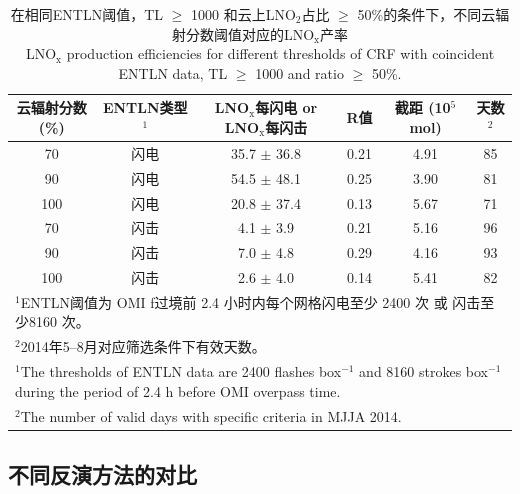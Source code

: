 \begin{table}[h]
\scriptsize
\caption{在相同ENTLN阈值，TL $\geq$ 1000 和云上LNO$_2$占比 $\geq$ 50\%的条件下，不同云辐射分数阈值对应的LNO$_\textrm{x}$产率 \\ LNO$_\textrm{x}$ production efficiencies for different thresholds of CRF with coincident ENTLN data, TL $\geq$ 1000 and ratio $\geq$ 50\%.}
\begin{tabular}{cccccc}
\hline
\textbf{云辐射分数 (\%)} & \textbf{ENTLN类型$^1$} & \textbf{LNO$_\textrm{x}$每闪电 or LNO$_\textrm{x}$每闪击} & \textbf{R值} & \textbf{截距 (10$^{5}$mol)} & \textbf{天数$^2$} \\
\hline
70  & 闪电  & 35.7  $\pm$ 36.8 & 0.21 & 4.91 & 85 \\
90  & 闪电  & 54.5  $\pm$ 48.1 & 0.25 & 3.90 & 81 \\
100 & 闪电  & 20.8  $\pm$ 37.4 & 0.13 & 5.67 & 71 \\
70  & 闪击 & 4.1   $\pm$ 3.9  & 0.21 & 5.16 & 96 \\
90  & 闪击 & 7.0   $\pm$ 4.8  & 0.29 & 4.16 & 93 \\
100 & 闪击 & 2.6   $\pm$ 4.0  & 0.14 & 5.41 & 82 \\
\hline
\multicolumn{6}{l}{$^1$ENTLN阈值为 OMI f过境前 2.4 小时内每个网格闪电至少 2400 次 或 闪击至少8160 次。}\\
\multicolumn{6}{l}{$^2$2014年5--8月对应筛选条件下有效天数。} \\
\multicolumn{6}{l}{$^1$The thresholds of ENTLN data are 2400 flashes box$^{-1}$ and 8160 strokes box$^{-1}$ during the period of 2.4 h before OMI overpass time.}\\
\multicolumn{6}{l}{$^2$The number of valid days with specific criteria in MJJA 2014.}
\end{tabular}
\label{table:CRFs}
\end{table}

\subsection{不同反演方法的对比}

